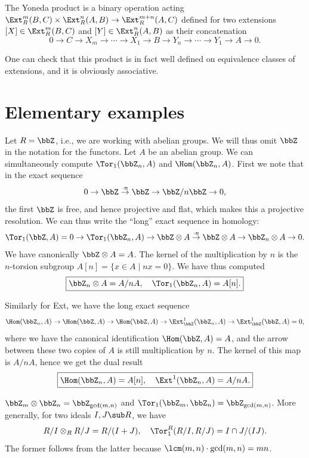 \begin{defn}
    The Yoneda product is a binary operation acting $\Ext^m_R(B,C)\times \Ext^n_R(A,B)\to \Ext^{m+n}_R(A,C)$ defined for two extensions $[X]\in \Ext^m_R(B,C)$ and $[Y]\in \Ext^n_R(A,B)$ as their concatenation
    \[0\to C\to X_m\to \cdots \to X_1\to B\to Y_n\to \cdots\to Y_1\to A\to 0.\]
\end{defn}

One can check that this product is in fact well defined on equivalence classes of extensions, and it is obviously associative.


\section{Elementary examples}

Let $R=\bbZ$, i.e., we are working with abelian groups. We will thus omit $\bbZ$ in the notation for the functors. Let $A$ be an abelian group. We can simultaneously compute $\Tor_1(\bbZ_n,A)$ and $\Hom(\bbZ_n,A)$. First we note that in the exact sequence
\[0\to \bbZ\overset{\cdot n}{\to}\bbZ\to \bbZ\slash n\bbZ \to 0,\]
the first $\bbZ$ is free, and hence projective and flat, which makes this a projective resolution. We can thus write the ``long'' exact sequence in homology:
\[\Tor_1(\bbZ,A)=0\to \Tor_1(\bbZ_n,A)\to \bbZ\otimes A\overset{\cdot n}{\to} \bbZ\otimes A\to \bbZ_n\otimes A\to 0.\]
We have canonically $\bbZ\otimes A=A$. The kernel of the multiplication by $n$ is the $n$-torsion subgroup $A[n]=\{x\in A\mid nx=0\}$. We have thus computed
\[\boxed{\bbZ_n\otimes A=A\slash nA,\quad \Tor_1(\bbZ_n,A)=A[n].}\]

Similarly for Ext, we have the long exact sequence
\[\Hom(\bbZ_n,A)\to \Hom(\bbZ,A)\to \Hom(\bbZ,A)\to \Ext^1_\bbZ(\bbZ_n,A)\to \Ext^1_\bbZ(\bbZ,A)=0,\]
where we have the canonical identification $\Hom(\bbZ,A)=A$, and the arrow between these two copies of $A$ is still multiplication by $n$. The kernel of this map is $A\slash nA$, hence we get the dual result
\[\boxed{\Hom(\bbZ_n,A)=A[n],\quad \Ext^1(\bbZ_n,A)=A\slash nA.}\]
    
\begin{cor}
    $\bbZ_m\otimes \bbZ_n=\bbZ_{\gcd(m,n)}$ and $\Tor_1(\bbZ_m,\bbZ_n)=\bbZ_{\gcd(m,n)}$. More generally, for two ideals $I,J\sub R$, we have
    \[R\slash I\otimes_R R\slash J=R\slash(I+J),\quad \Tor_1^R(R\slash I,R\slash J)=I\cap J\slash (IJ).\]
    The former follows from the latter because $\lcm(m,n)\cdot\gcd(m,n)=mn$.
\end{cor}

